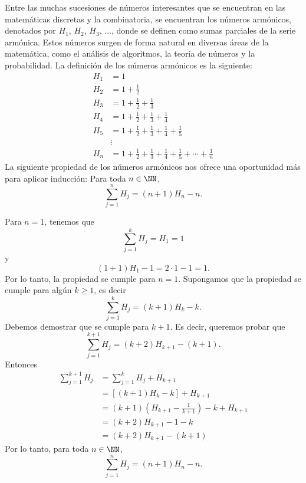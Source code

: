 \begin{examplebox}{}{}
    Entre las muchas sucesiones de números interesantes que se encuentran en las matemáticas discretas y la combinatoria, se encuentran los números armónicos, denotados por $H_1$, $H_2$, $H_3$, $\dots$, donde se definen como sumas parciales de la serie armónica. Estos números surgen de forma natural en diversas áreas de la matemática, como el análisis de algoritmos, la teoría de números y la probabilidad. La definición de los números armónicos es la siguiente:
    \begin{align*}
        H_1 & = 1 \\
        H_2 & = 1 + \frac{1}{2} \\
        H_3 & = 1 + \frac{1}{2} + \frac{1}{3} \\
        H_4 & = 1 + \frac{1}{2} + \frac{1}{3} + \frac{1}{4} \\
        H_5 & = 1 + \frac{1}{2} + \frac{1}{3} + \frac{1}{4} + \frac{1}{5} \\
        & \vdots \\
        H_n & = 1 + \frac{1}{2} + \frac{1}{3} + \frac{1}{4} + \frac{1}{5} + \cdots + \frac{1}{n}
    \end{align*}
    La siguiente propiedad de los números armónicos nos ofrece una oportunidad más para aplicar inducción: Para toda $n \in \NN$,
    $$\sum_{j=1}^{n} H_j = (n + 1)H_n - n.$$

    \tcblower
    \demostracion Para $n = 1$, tenemos que
    $$\sum_{j=1}^{k} H_j = H_1 = 1$$
    y
    $$(1 + 1)H_1 - 1 = 2 \cdot 1 - 1 = 1.$$
    Por lo tanto, la propiedad se cumple para $n = 1$. Supongamos que la propiedad se cumple para algún $k \geq 1$, es decir
    $$\sum_{j=1}^{k} H_j = (k + 1)H_k - k.$$
    Debemos demostrar que se cumple para $k + 1$. Es decir, queremos probar que
    $$\sum_{j=1}^{k+1} H_j = (k + 2)H_{k+1} - (k + 1).$$
    Entonces
    \begin{align*}
        \sum_{j=1}^{k+1} H_j & = \sum_{j=1}^{k} H_j + H_{k+1} \\
        & = [(k + 1)H_k - k] + H_{k+1} \\
        & = (k + 1) \left( H_{k+1} - \frac{1}{k+1} \right) - k + H_{k+1} \\
        & = (k + 2) H_{k+1} - 1 - k \\
        & = (k + 2) H_{k+1} - (k + 1)
    \end{align*}
    Por lo tanto, para toda $n \in \NN$,
    $$\sum_{j=1}^{n} H_j = (n + 1)H_n - n.$$
\end{examplebox}

